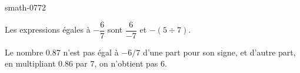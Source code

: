 
\begin{corrige}{smath-0772}

    Les expressions égales à \( -\dfrac{ 6 }{ 7 }\) sont \( \dfrac{ 6 }{ -7 }\) et \( -(5\div 7)\).

    Le nombre \( 0.87\) n'est pas égal à \( -6/7\) d'une part pour son signe, et d'autre part, en multipliant \( 0.86\) par \( 7\), on n'obtient pas \( 6\).

\end{corrige}
